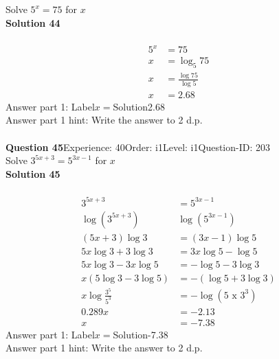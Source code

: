 \documentclass{article}
\begin{document}
Solve $5^x=75$ for $x$\\[4pt]
\noindent\textbf{Solution 44}\\[2pt]
\\[-35pt]\begin{align*}
5^x&=75\\[2pt]
x&=\log_{5}75\\[2pt]
x&=\displaystyle\frac{\log75}{\log5}\\[2pt]
x&=2.68
\end{align*}
Answer part 1: \hspace{10pt}Label\hspace{10pt}$x=$\hspace{10pt}Solution\hspace{10pt}2.68\\
Answer part 1 hint: \hspace{15pt}Write the answer to 2 d.p.\\
\\[4pt]
\noindent\textbf{Question 45}\hspace{20pt}Experience: 40\hspace{20pt}Order: i1\hspace{20pt}Level: i1\hspace{20pt}Question-ID: 203\\[2pt]
Solve $3^{5x+3}=5^{3x-1}$ for $x$\\[4pt]
\noindent\textbf{Solution 45}\\[2pt]
\\[-35pt]\begin{align*}
3^{5x+3}&=5^{3x-1}\\[2pt]
\log(3^{5x+3})&\log(5^{3x-1})\\[2pt]
(5x+3)\log3&=(3x-1)\log5\\[2pt]
5x\log3+3\log3&=3x\log5-\log5\\[2pt]
5x\log3-3x\log5&=-\log5-3\log3\\[2pt]
x(5\log3-3\log5)&=-(\log5+3\log3)\\[2pt]
x\log\displaystyle\frac{3^5}{5^3}&=-\log(5 \,\, \text{x} \,\, 3^3)\\[2pt]
0.289x&=-2.13\\[2pt]
x&=-7.38
\end{align*}
Answer part 1: \hspace{10pt}Label\hspace{10pt}$x=$\hspace{10pt}Solution\hspace{10pt}-7.38\\
Answer part 1 hint: \hspace{15pt}Write the answer to 2 d.p.\\
\end{document}
